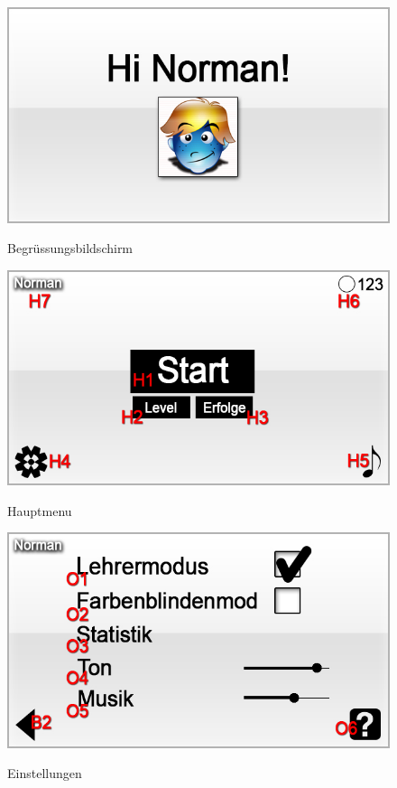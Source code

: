 \begin{figure}[H]
\centering
{}\label{fig:Welcome}
\includegraphics[scale=0.55]{../GUI-Entwurf/_jpeg_numeration/welcome.jpg}
\caption{Begrüssungsbildschirm}
\end{figure}

\begin{figure}[H]
\centering
{}\label{fig:Hauptmenu}
\includegraphics[scale=0.55]{../GUI-Entwurf/_jpeg_numeration/main_manu.jpg}
\caption{Hauptmenu}
\end{figure}

\begin{figure}[H]
\centering
{}\label{fig:Einstellungen}
\includegraphics[scale=0.55]{../GUI-Entwurf/_jpeg_numeration/settings.jpg}
\caption{Einstellungen}
\end{figure}

